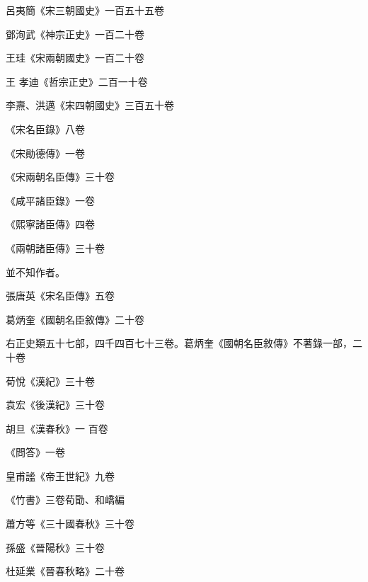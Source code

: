 \begin{pinyinscope}
 呂夷簡《宋三朝國史》一百五十五卷



 鄧洵武《神宗正史》一百二十卷



 王珪《宋兩朝國史》一百二十卷



 王
 孝迪《哲宗正史》二百一十卷



 李燾、洪邁《宋四朝國史》三百五十卷



 《宋名臣錄》八卷



 《宋勛德傳》一卷



 《宋兩朝名臣傳》三十卷



 《咸平諸臣錄》一卷



 《熙寧諸臣傳》四卷



 《兩朝諸臣傳》三十卷



 並不知作者。



 張唐英《宋名臣傳》五卷



 葛炳奎《國朝名臣敘傳》二十卷



 右正史類五十七部，四千四百七十三卷。葛炳奎《國朝名臣敘傳》不著錄一部，二十卷



 荀悅《漢紀》三十卷



 袁宏《後漢紀》三十卷



 胡旦《漢春秋》一
 百卷



 《問答》一卷



 皇甫謐《帝王世紀》九卷



 《竹書》三卷荀勖、和嶠編



 蕭方等《三十國春秋》三十卷



 孫盛《晉陽秋》三十卷



 杜延業《晉春秋略》二十卷




\end{pinyinscope}
